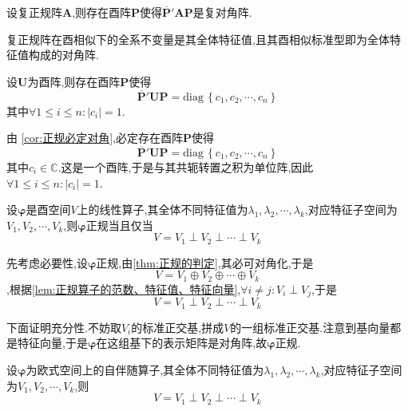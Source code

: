 \begin{green}
    \begin{corollary}[正规必定对角]\label{cor:正规必定对角}
        设复正规阵$\bm{A}$,则存在酉阵$\bm{P}$使得$\overline{\bm{P}}'\bm{A}\bm{P}$是复对角阵.
    \end{corollary}
\end{green}
\begin{green}
    \begin{corollary}[复正规阵在酉相似下的全系不变量]\label{cor:复正规阵在酉相似下的全系不变量}
        复正规阵在酉相似下的全系不变量是其全体特征值,且其酉相似标准型即为全体特征值构成的对角阵.
    \end{corollary}
\end{green}
\begin{green}
    \begin{corollary}[酉阵的酉相似标准型]\label{cor:酉阵的酉相似标准型}
        设$\bm{U}$为酉阵,则存在酉阵$\bm{P}$使得\[
        \overline{\bm{P}}'\bm{UP}= \mathrm{diag}\,\left\{
            c_1,c_2,\cdots,c_n
        \right\}
        \]其中$\forall 1\leqslant i\leqslant n:\left|c_i\right|=1.$
    \end{corollary}
    \begin{Proof}
  由      \cref{cor:正规必定对角},必定存在酉阵$\bm{P}$使得\[
        \overline{\bm{P}}'\bm{UP}= \mathrm{diag}\,\left\{
            c_1,c_2,\cdots,c_n
        \right\}    
  \]其中$c_i\in\mathbb{C}$.这是一个酉阵,于是与其共轭转置之积为单位阵,因此$\forall1\leqslant i\leqslant n:\left|c_i\right|=1.$
    \end{Proof}
\end{green}
\begin{formal}
    \begin{theorem}[特征子空间确定的正规算子]\label{thm:特征子空间确定的正规算子}
        设$\bm{\varphi}$是酉空间$V$上的线性算子,其全体不同特征值为$\lambda_1,\lambda_2,\cdots,\lambda_k$,对应特征子空间为$V_1,V_2,\cdots,V_k$,则$\bm{\varphi}$正规当且仅当\[
        V=V_1\perp V_2\perp\cdots\perp V_k
        \]
    \end{theorem}
    \begin{Proof}
        先考虑必要性,设$\bm{\varphi}$正规,由\cref{thm:正规的判定},其必可对角化,于是\[
        V=V_1\oplus V_2\oplus\cdots\oplus V_k
        \],根据\cref{lem:正规算子的范数、特征值、特征向量},$\forall i\neq j:V_i\perp V_j$,于是\[
        V=V_1\perp V_2\perp\cdots\perp V_k
        \]

        下面证明充分性.不妨取$V_i$的标准正交基,拼成$V$的一组标准正交基.注意到基向量都是特征向量,于是$\bm{\varphi}$在这组基下的表示矩阵是对角阵,故$\bm{\varphi}$正规.
    \end{Proof}
\end{formal}
\begin{green}
    \begin{corollary}[自伴随算子的特征子空间]\label{cor:自伴随算子的特征子空间}
        设$\bm{\varphi}$为欧式空间上的自伴随算子,其全体不同特征值为$\lambda_1,\lambda_2,\cdots,\lambda_k$,对应特征子空间为$V_1,V_2,\cdots,V_k$,则\[
        V=V_1\perp V_2\perp\cdots\perp V_k
        \]
    \end{corollary}
\end{green}
